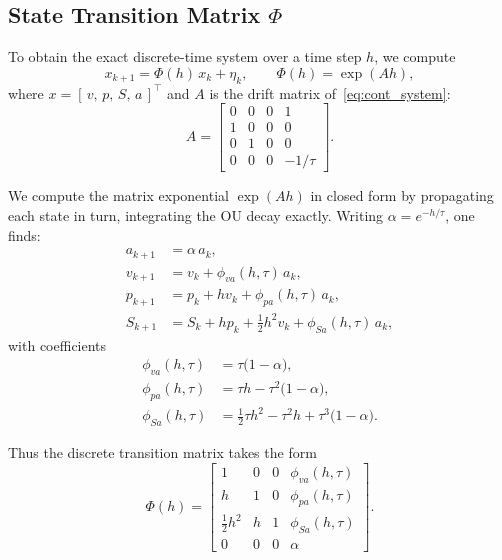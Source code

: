 \documentclass[10pt]{extarticle}
\begin{document}
\subsection{State Transition Matrix $\Phi$}

To obtain the exact discrete-time system over a time step $h$, we compute
%
\begin{equation}
x_{k+1} = \Phi(h) \, x_k + \eta_k, \qquad
\Phi(h) = \exp(A h),
\end{equation}
%
where $x = [\, v,\, p,\, S,\, a \,]^\top$ and $A$ is the drift matrix
of~\eqref{eq:cont_system}:
%
\begin{equation}
A =
\begin{bmatrix}
0 & 0 & 0 & 1 \\
1 & 0 & 0 & 0 \\
0 & 1 & 0 & 0 \\
0 & 0 & 0 & -1/\tau
\end{bmatrix}.
\end{equation}

We compute the matrix exponential $\exp(Ah)$ in closed form by propagating
each state in turn, integrating the OU decay exactly. Writing
$\alpha = e^{-h/\tau}$, one finds:
%
\begin{align}
a_{k+1} &= \alpha \, a_k, \\[0.5ex]
v_{k+1} &= v_k + \phi_{va}(h,\tau) \, a_k, \\
p_{k+1} &= p_k + h v_k + \phi_{pa}(h,\tau) \, a_k, \\
S_{k+1} &= S_k + h p_k + \tfrac{1}{2} h^2 v_k + \phi_{Sa}(h,\tau) \, a_k,
\end{align}
with coefficients
\begin{align}
\phi_{va}(h,\tau) &= \tau \bigl(1 - \alpha \bigr), \label{eq:phi_va}\\
\phi_{pa}(h,\tau) &= \tau h - \tau^2 \bigl(1 - \alpha \bigr), \label{eq:phi_pa}\\
\phi_{Sa}(h,\tau) &= \tfrac{1}{2}\tau h^2 - \tau^2 h + \tau^3 \bigl(1 - \alpha \bigr). \label{eq:phi_Sa}
\end{align}

Thus the discrete transition matrix takes the form
%
\begin{equation}
\Phi(h) =
\begin{bmatrix}
1 & 0 & 0 & \phi_{va}(h,\tau) \\
h & 1 & 0 & \phi_{pa}(h,\tau) \\
\frac{1}{2}h^2 & h & 1 & \phi_{Sa}(h,\tau) \\
0 & 0 & 0 & \alpha
\end{bmatrix}.
\end{equation}
\end{document}
